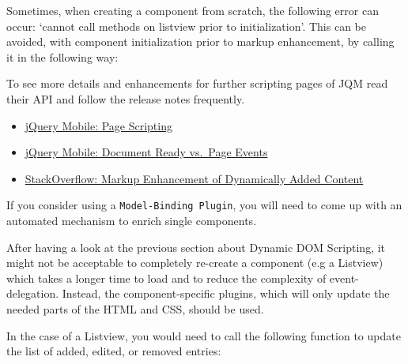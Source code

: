 \documentclass[9pt]{book}
\newenvironment{Shaded}{}{}
\newcommand{\StringTok}[1]{\textcolor[rgb]{0.25,0.44,0.63}{{#1}}}
\newcommand{\FunctionTok}[1]{\textcolor[rgb]{0.02,0.16,0.49}{{#1}}}
\newcommand{\NormalTok}[1]{{#1}}
\begin{document}
Sometimes, when creating a component from scratch, the following error
can occur: `cannot call methods on listview prior to initialization'.
This can be avoided, with component initialization prior to markup
enhancement, by calling it in the following way:

\begin{Shaded}
\end{Shaded}

To see more details and enhancements for further scripting pages of JQM
read their API and follow the release notes frequently.

\begin{itemize}
\itemsep1pt\parskip0pt
\item
  \href{http://jquerymobile.com/test/docs/pages/page-scripting.html}{jQuery
  Mobile: Page Scripting}
\item
  \href{http://stackoverflow.com/questions/14468659/jquery-mobile-document-ready-vs-page-events/}{jQuery
  Mobile: Document Ready vs.~Page Events}
\item
  \href{http://stackoverflow.com/questions/14550396/jquery-mobile-markup-enhancement-of-dynamically-added-content}{StackOverflow:
  Markup Enhancement of Dynamically Added Content}
\end{itemize}

If you consider using a \texttt{Model-Binding Plugin}, you will need to
come up with an automated mechanism to enrich single components.

After having a look at the previous section about Dynamic DOM Scripting,
it might not be acceptable to completely re-create a component (e.g a
Listview) which takes a longer time to load and to reduce the complexity
of event-delegation. Instead, the component-specific plugins, which will
only update the needed parts of the HTML and CSS, should be used.

In the case of a Listview, you would need to call the following function
to update the list of added, edited, or removed entries:

\begin{Shaded}
\end{Shaded}
\end{document}
